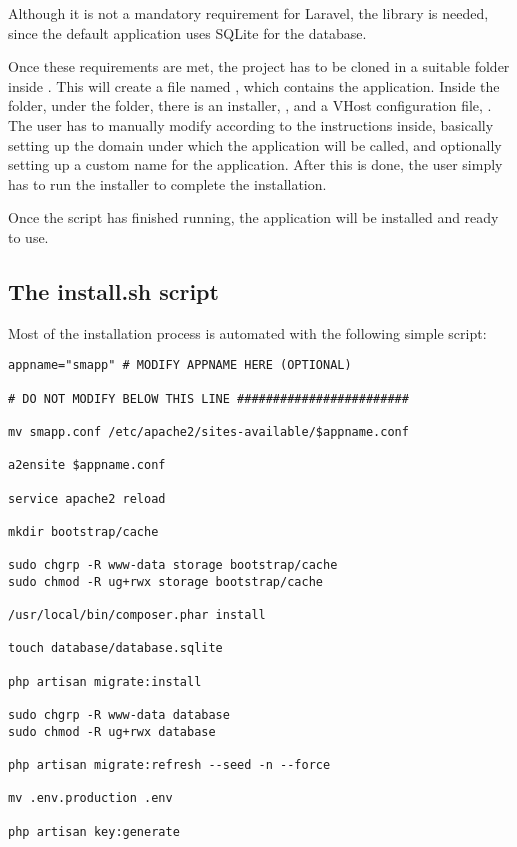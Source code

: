 Although it is not a mandatory requirement for Laravel, the  library is needed, since the default application uses SQLite for the database.

Once these requirements are met, the project has to be cloned in a suitable folder inside . This will create a file named , which contains the application. Inside the folder, under the  folder, there is an installer, , and a VHost configuration file, . The user has to manually modify  according to the instructions inside, basically setting up the domain under which the application will be called, and optionally setting up a custom name for the application. After this is done, the user simply has to run the installer to complete the installation.

Once the script has finished running, the application will be installed and ready to use.

\subsection{The install.sh script}
Most of the installation process is automated with the following simple script:

\begin{verbatim}
appname="smapp" # MODIFY APPNAME HERE (OPTIONAL)

# DO NOT MODIFY BELOW THIS LINE ########################

mv smapp.conf /etc/apache2/sites-available/$appname.conf

a2ensite $appname.conf

service apache2 reload

mkdir bootstrap/cache

sudo chgrp -R www-data storage bootstrap/cache
sudo chmod -R ug+rwx storage bootstrap/cache

/usr/local/bin/composer.phar install

touch database/database.sqlite

php artisan migrate:install

sudo chgrp -R www-data database
sudo chmod -R ug+rwx database

php artisan migrate:refresh --seed -n --force

mv .env.production .env

php artisan key:generate
\end{verbatim}

